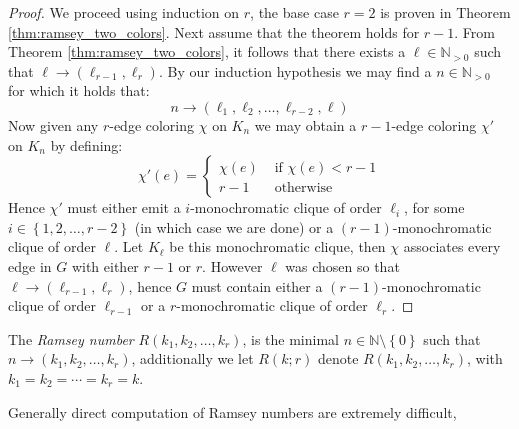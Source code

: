 \begin{proof}
	We proceed using induction on $r$, the base case $r = 2$ is proven in Theorem \ref{thm:ramsey_two_colors}.
	Next assume that the theorem holds for $r - 1$. From Theorem \ref{thm:ramsey_two_colors}, it follows that there exists a $\ell \in \mathbb{N}_{> 0}$ such that $\ell \to (\ell_{r - 1}, \ell_{r})$.
	By our induction hypothesis we may find a $n \in \mathbb{N}_{> 0}$ for which it holds that:
	\begin{equation*}
		n \to (\ell_1, \ell_2, \ldots, \ell_{r - 2}, \ell)
	\end{equation*}
	Now given any $r$-edge coloring $\chi$ on $K_n$ we may obtain a $r - 1$-edge coloring $\chi'$ on $K_n$ by defining:
	\begin{equation*}
		\chi'(e) = \begin{cases} \chi(e) & \text{ if } \chi(e) < r - 1 \\ r - 1 & \text{ otherwise } \end{cases}
	\end{equation*}
	Hence $\chi'$ must either emit a $i$-monochromatic clique of order $\ell_i$, for some $i \in \left\{1, 2, \ldots, r - 2\right\}$ (in which case we are done) or a $(r - 1)$-monochromatic clique of order $\ell$. Let $K_\ell$ be this monochromatic clique, then $\chi$ associates every edge in $G$ with either $r - 1$ or $r$. However $\ell$ was chosen so that $\ell \to (\ell_{r - 1}, \ell_r)$, hence $G$ must contain either a $(r - 1)$-monochromatic clique of order $\ell_{r - 1}$ or a $r$-monochromatic clique of order $\ell_{r}$.
\end{proof}

\begin{definition}
	The \textit{Ramsey number} $R(k_1, k_2, \ldots, k_{r})$, is the minimal $n \in \mathbb{N} \setminus \left\{0\right\}$ such that $n \to (k_1, k_2, \ldots, k_{r})$, additionally we let $R(k; r)$ denote $R(k_1, k_2, \ldots, k_{r})$, with $k_1 = k_2 = \cdots = k_r = k$.
\end{definition}
Generally direct computation of Ramsey numbers are extremely difficult,




